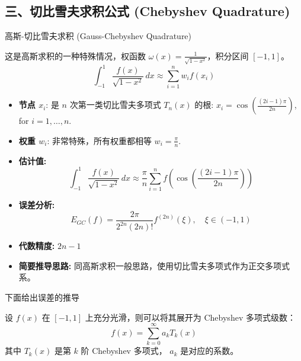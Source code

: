 \subsection{三、切比雪夫求积公式 (Chebyshev Quadrature)}

高斯-切比雪夫求积 (Gauss-Chebyshev Quadrature)

这是高斯求积的一种特殊情况，权函数 $\omega(x) = \frac{1}{\sqrt{1-x^2}}$，积分区间 $[-1,1]$。
\[
\int_{-1}^1 \frac{f(x)}{\sqrt{1-x^2}} \, dx \approx \sum_{i=1}^n w_i f(x_i)
\]
\begin{itemize}
	\item \textbf{节点 $x_i$}: 是 $n$ 次第一类切比雪夫多项式 $T_n(x)$ 的根: $x_i = \cos\left(\frac{(2i-1)\pi}{2n}\right)$, for $i=1, \dots, n$.
\end{itemize}

\begin{itemize}
	\item \textbf{权重 $w_i$}: 非常特殊，所有权重都相等 $w_i = \frac{\pi}{n}$.
	\item \textbf{估计值:}
\[
\int_{-1}^1 \frac{f(x)}{\sqrt{1-x^2}} \, dx \approx \frac{\pi}{n} \sum_{i=1}^n f\left(\cos\left(\frac{(2i-1)\pi}{2n}\right)\right)
\]	\item \textbf{误差分析:}
\[
E_{GC}(f) = \frac{2\pi}{2^{2n}(2n)!} f^{(2n)}(\xi), \quad \xi \in (-1,1)
\]	\item \textbf{代数精度:} $2n-1$
	\item \textbf{简要推导思路:} 同高斯求积一般思路，使用切比雪夫多项式作为正交多项式系。
\end{itemize}

下面给出误差的推导

设 $f(x)$ 在 $[-1,1]$ 上充分光滑，则可以将其展开为 Chebyshev 多项式级数：
\[
f(x) = \sum_{k=0}^{\infty} a_k T_k(x)
\]
其中 $T_k(x)$ 是第 $k$ 阶 Chebyshev 多项式， $a_k$ 是对应的系数。

